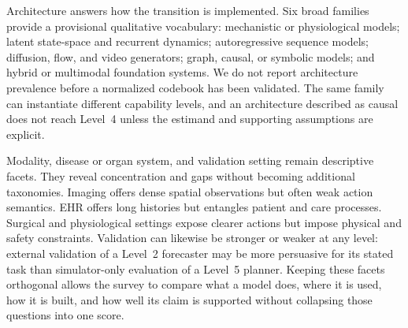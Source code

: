 Architecture answers how the transition is implemented. Six broad families provide a provisional qualitative vocabulary: mechanistic or physiological models; latent state-space and recurrent dynamics; autoregressive sequence models; diffusion, flow, and video generators; graph, causal, or symbolic models; and hybrid or multimodal foundation systems. We do not report architecture prevalence before a normalized codebook has been validated. The same family can instantiate different capability levels, and an architecture described as causal does not reach Level~4 unless the estimand and supporting assumptions are explicit.

Modality, disease or organ system, and validation setting remain descriptive facets. They reveal concentration and gaps without becoming additional taxonomies. Imaging offers dense spatial observations but often weak action semantics. EHR offers long histories but entangles patient and care processes. Surgical and physiological settings expose clearer actions but impose physical and safety constraints. Validation can likewise be stronger or weaker at any level: external validation of a Level~2 forecaster may be more persuasive for its stated task than simulator-only evaluation of a Level~5 planner. Keeping these facets orthogonal allows the survey to compare what a model does, where it is used, how it is built, and how well its claim is supported without collapsing those questions into one score.
